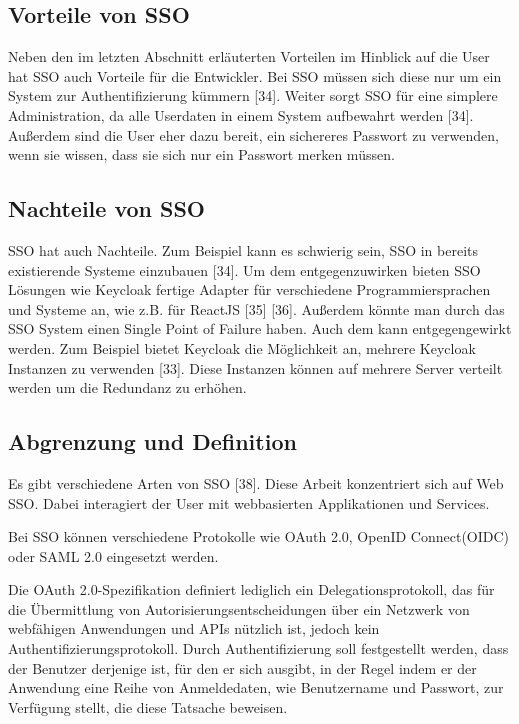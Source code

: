\subsection{Vorteile von SSO}

Neben den im letzten Abschnitt erläuterten Vorteilen im Hinblick auf die User hat SSO auch Vorteile für die Entwickler. Bei SSO müssen sich diese nur um ein System zur Authentifizierung kümmern [34]. Weiter sorgt SSO für eine simplere Administration, da alle Userdaten in einem System aufbewahrt werden [34]. Außerdem sind die User eher dazu bereit, ein sichereres Passwort zu verwenden, wenn sie wissen, dass sie sich nur ein Passwort merken müssen.

\subsection{Nachteile von SSO}

SSO hat auch Nachteile. Zum Beispiel kann es schwierig sein, SSO in bereits existierende Systeme einzubauen [34]. Um dem entgegenzuwirken bieten SSO Lösungen wie Keycloak fertige Adapter für verschiedene Programmiersprachen und Systeme an, wie z.B. für ReactJS [35] [36]. Außerdem könnte man durch das SSO System einen Single Point of Failure haben. Auch dem kann entgegengewirkt werden. Zum Beispiel bietet Keycloak die Möglichkeit an, mehrere Keycloak Instanzen zu verwenden [33]. Diese Instanzen können auf mehrere Server verteilt werden um die Redundanz zu erhöhen. %

\subsection{Abgrenzung und Definition}

Es gibt verschiedene Arten von SSO [38]. Diese Arbeit konzentriert sich auf Web SSO. Dabei interagiert der User mit webbasierten Applikationen und Services.

Bei SSO können verschiedene Protokolle wie OAuth 2.0, OpenID Connect(OIDC) oder SAML 2.0 eingesetzt werden. 

Die OAuth 2.0-Spezifikation definiert lediglich ein Delegationsprotokoll, das für die Übermittlung von Autorisierungsentscheidungen über ein Netzwerk von webfähigen Anwendungen und APIs nützlich ist, jedoch kein Authentifizierungsprotokoll. Durch Authentifizierung soll festgestellt werden, dass der Benutzer derjenige ist, für den er sich ausgibt, in der Regel indem er der Anwendung eine Reihe von Anmeldedaten, wie Benutzername und Passwort, zur Verfügung stellt, die diese Tatsache beweisen. \cite{OAuth2inAction}

